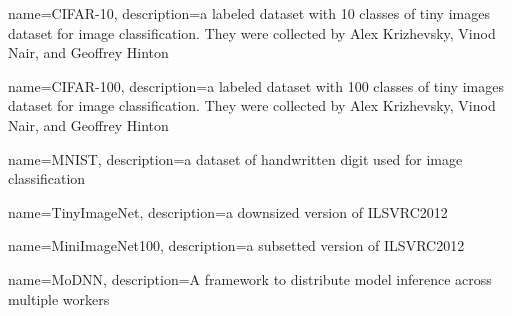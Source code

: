 {
	name={CIFAR-10},
	description={a labeled dataset with 10 classes of tiny images dataset for image classification. They were collected by Alex Krizhevsky, Vinod Nair, and Geoffrey Hinton}
}

{
	name={CIFAR-100},
	description={a labeled dataset with 100 classes of tiny images dataset for image classification. They were collected by Alex Krizhevsky, Vinod Nair, and Geoffrey Hinton}
}

{
	name={MNIST},
	description={a dataset of handwritten digit used for image classification}
}

{
	name={TinyImageNet},
	description={a downsized version of ILSVRC2012}
}

{
	name={MiniImageNet100},
	description={a subsetted version of ILSVRC2012}
}

{
	name={MoDNN},
	description={A framework to distribute model inference across multiple workers}
}



